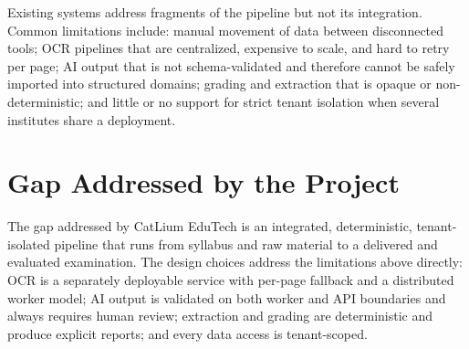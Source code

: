 Existing systems address fragments of the pipeline but not its integration.
Common limitations include: manual movement of data between disconnected
tools; OCR pipelines that are centralized, expensive to scale, and hard to
retry per page; AI output that is not schema-validated and therefore cannot
be safely imported into structured domains; grading and extraction that is
opaque or non-deterministic; and little or no support for strict tenant
isolation when several institutes share a deployment.

\section{Gap Addressed by the Project}

The gap addressed by CatLium EduTech is an integrated, deterministic,
tenant-isolated pipeline that runs from syllabus and raw material to a
delivered and evaluated examination. The design choices address the
limitations above directly: OCR is a separately deployable service with
per-page fallback and a distributed worker model; AI output is validated on
both worker and API boundaries and always requires human review; extraction
and grading are deterministic and produce explicit reports; and every data
access is tenant-scoped.